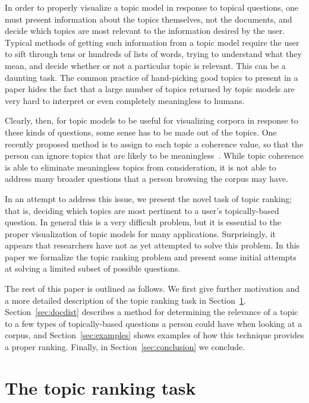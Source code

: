 \documentclass{article}
\newcommand{\secref}[1]{Section~\ref{sec:#1}}
\begin{document}
In order to properly visualize a topic model in response to topical questions,
one must present information about the topics themselves, not the documents,
and decide which topics are most relevant to the information desired by the
user.  Typical methods of getting such information from a topic model require
the user to sift through tens or hundreds of lists of words, trying to
understand what they mean, and decide whether or not a particular topic is
relevant.  This can be a daunting task.  The common practice of hand-picking
good topics to present in a paper hides the fact that a large number of topics
returned by topic models are very hard to interpret or even completely
meaningless to humans.

Clearly, then, for topic models to be useful for visualizing corpora in
response to these kinds of questions, some sense has to be made out of the
topics.  One recently proposed method is to assign to each topic a coherence
value, so that the person can ignore topics that are likely to be
meaningless~\cite{newman-2010-automatic-evaluation-of-topic-coherence}.  While
topic coherence is able to eliminate meaningless topics from consideration, it
is not able to address many broader questions that a person browsing the corpus
may have.

In an attempt to address this issue, we present the novel task of topic
ranking; that is, deciding which topics are most pertinent to a user's
topically-based question.  In general this is a very difficult problem, but it
is essential to the proper visualization of topic models for many applications.
Surprisingly, it appears that researchers have not as yet attempted to solve
this problem.  In this paper we formalize the topic ranking problem and present
some initial attempts at solving a limited subset of possible questions.

The rest of this paper is outlined as follows.  We first give further
motivation and a more detailed description of the topic ranking task in
\secref{ranking}.  \secref{docdist} describes a method for determining the
relevance of a topic to a few types of topically-based questions a person could
have when looking at a corpus, and \secref{examples} shows examples of how this
technique provides a proper ranking.  Finally, in \secref{conclusion} we
conclude.

\section{The topic ranking task}
\label{sec:ranking}
\end{document}
